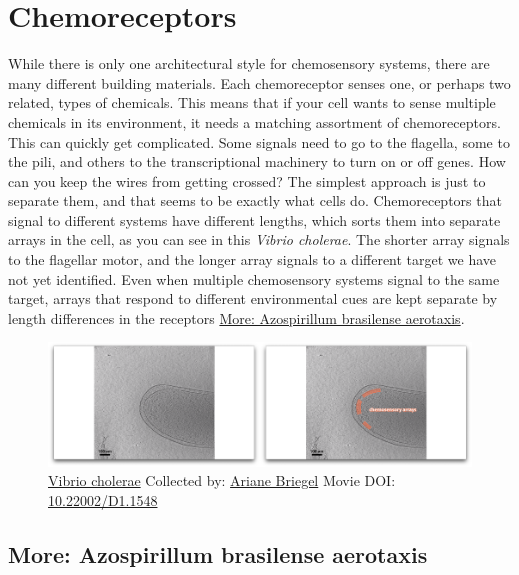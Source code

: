 \documentclass[]{tufte-book}
\begin{document}
\section{Chemoreceptors}\label{chemoreceptors}

While there is only one architectural style for chemosensory systems,
there are many different building materials. Each chemoreceptor senses
one, or perhaps two related, types of chemicals. This means that if your
cell wants to sense multiple chemicals in its environment, it needs a
matching assortment of chemoreceptors. This can quickly get complicated.
Some signals need to go to the flagella, some to the pili, and others to
the transcriptional machinery to turn on or off genes. How can you keep
the wires from getting crossed? The simplest approach is just to
separate them, and that seems to be exactly what cells do.
Chemoreceptors that signal to different systems have different lengths,
which sorts them into separate arrays in the cell, as you can see in
this \emph{Vibrio cholerae}. The shorter array signals to the flagellar
motor, and the longer array signals to a different target we have not
yet identified. Even when multiple chemosensory systems signal to the
same target, arrays that respond to different environmental cues are
kept separate by length differences in the receptors
\protect\hyperlink{Azospirillum_brasilense_aerotaxis}{More: Azospirillum
brasilense aerotaxis}.





\begin{figure}
\includegraphics{movie_stills/7_4} \caption[\protect\hyperlink{tree}{Vibrio cholerae} Collected by:
\protect\hyperlink{ariane_briegel}{Ariane Briegel} Movie DOI:
\href{https://doi.org/10.22002/D1.1548}{10.22002/D1.1548}]{\protect\hyperlink{tree}{Vibrio cholerae} Collected by:
\protect\hyperlink{ariane_briegel}{Ariane Briegel} Movie DOI:
\href{https://doi.org/10.22002/D1.1548}{10.22002/D1.1548}}\label{fig:7-4}
\end{figure}

\hypertarget{Azospirillum_brasilense_aerotaxis}{\subsection*{More:
Azospirillum brasilense
aerotaxis}\label{Azospirillum_brasilense_aerotaxis}}
\end{document}
